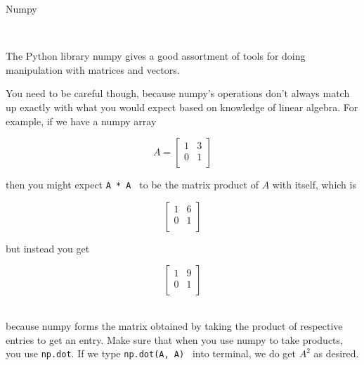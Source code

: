 \documentclass{article}
\begin{document}
\centerline{\sc \large Numpy}\

The Python library numpy gives a good assortment of tools for doing manipulation with matrices and vectors.

You need to be careful though, because numpy's operations don't always match up exactly with what you would expect based on knowledge of linear algebra. For example, if we have a numpy array

\[ A = \left[ \begin{array}{cc}
1 & 3 \\
0 & 1 \\
\end{array} \right]\] 

then you might expect  \verb|A * A | to be the matrix product of $A$ with itself, which is 

\[ \left[ \begin{array}{cc}
1 & 6 \\
0 & 1 \\
\end{array} \right]\] 

\noindent but instead you get 

\[ \left[ \begin{array}{cc}
1 & 9 \\
0 & 1 \\
\end{array} \right]\]\

\noindent because numpy forms the matrix obtained by taking the product of respective entries to get an entry. Make sure that when you use numpy to take products, you use  \verb|np.dot|. If we type  \verb|np.dot(A, A) | into terminal, we do get $A^2$ as desired.
\end{document}
